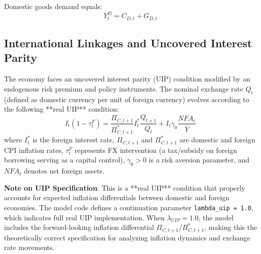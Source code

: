 \documentclass[12pt]{article}
\begin{document}
Domestic goods demand equals:
\begin{equation}
Y_t^D = C_{D,t} + G_{D,t}
\end{equation}

\subsection{International Linkages and Uncovered Interest Parity}\label{sec:uip}

The economy faces an uncovered interest parity (UIP) condition modified by an endogenous risk premium and policy instruments. The nominal exchange rate $Q_t$ (defined as domestic currency per unit of foreign currency) evolves according to the following **real UIP** condition:
\begin{equation}\label{eq:uip}
I_t (1 - \tau_t^F) = \frac{\Pi_{C,t+1}}{\Pi_{C,t+1}^*} I_t^* \frac{Q_{t+1}}{Q_t} + I_t \gamma_0 \frac{NFA_t}{\overline{Y}}
\end{equation}
where $I_t^*$ is the foreign interest rate, $\Pi_{C,t+1}$ and $\Pi_{C,t+1}^*$ are domestic and foreign CPI inflation rates, $\tau_t^F$ represents FX intervention (a tax/subsidy on foreign borrowing serving as a capital control), $\gamma_0 > 0$ is a risk aversion parameter, and $NFA_t$ denotes net foreign assets.

\textbf{Note on UIP Specification}: This is a **real UIP** condition that properly accounts for expected inflation differentials between domestic and foreign economies. The model code defines a continuation parameter \texttt{lambda\_uip = 1.0}, which indicates full real UIP implementation. When $\lambda_{UIP} = 1.0$, the model includes the forward-looking inflation differential $\Pi_{C,t+1}/\Pi_{C,t+1}^*$, making this the theoretically correct specification for analyzing inflation dynamics and exchange rate movements.
\end{document}
